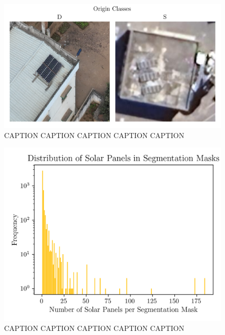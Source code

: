 \documentclass[conference]{IEEEtran}
\begin{document}
\begin{figure}[H]
    \centering
    \includegraphics[width=1\linewidth]{assets/data_origin_classes.png}
    \caption{CAPTION CAPTION CAPTION CAPTION CAPTION}
    \label{fig:data_origin_classes}
\end{figure}

\begin{figure}[H]
    \centering
    \includegraphics[width=1\linewidth]{assets/data_panel_distribution.png}
    \caption{CAPTION CAPTION CAPTION CAPTION CAPTION}
    \label{fig:data_panel_distribution}
\end{figure}
\end{document}

